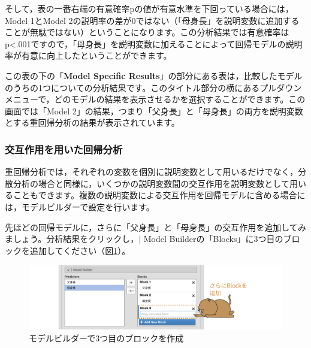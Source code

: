 \documentclass[
  12pt,
  a5jpaper,
  lualatex, ja=standard]{bxjsbook}
\begin{document}
そして，表の一番右端の有意確率pの値が有意水準を下回っている場合には，Model 1とModel 2の説明率の差が0ではない（「母身長」を説明変数に追加することが無駄ではない）ということになります。この分析結果では有意確率はp\textless.001ですので，「母身長」を説明変数に加えることによって回帰モデルの説明率が有意に向上したということができます。

この表の下の「\textbf{Model Specific Results}」の部分にある表は，比較したモデルのうちの1つについての分析結果です。このタイトル部分の横にあるプルダウンメニューで，どのモデルの結果を表示させるかを選択することができます。この画面では「Model 2」の結果，つまり「父身長」と「母身長」の両方を説明変数とする重回帰分析の結果が表示されています。

\hypertarget{ux4ea4ux4e92ux4f5cux7528ux3092ux7528ux3044ux305fux56deux5e30ux5206ux6790}{%
\subsubsection*{交互作用を用いた回帰分析}\label{ux4ea4ux4e92ux4f5cux7528ux3092ux7528ux3044ux305fux56deux5e30ux5206ux6790}}

重回帰分析では，それぞれの変数を個別に説明変数として用いるだけでなく，分散分析の場合と同様に，いくつかの説明変数間の交互作用を説明変数として用いることもできます。複数の説明変数による交互作用を回帰モデルに含める場合には，モデルビルダーで設定を行います。

先ほどの回帰モデルに，さらに「父身長」と「母身長」の交互作用を追加してみましょう。分析結果をクリックし，\colorbox{bar}{\textcolor{gmoji2}{| Model Builder}}の「Blocks」に3つ目のブロックを追加してください（図\ref{fig:regression-lr-model-builder-interaction}）。

\begin{figure}[!ht]

{\centering \includegraphics[width=1\linewidth]{images/regression/lr-model-builder-interaction} 

}

\caption{モデルビルダーで3つ目のブロックを作成}\label{fig:regression-lr-model-builder-interaction}
\end{figure}
\end{document}
